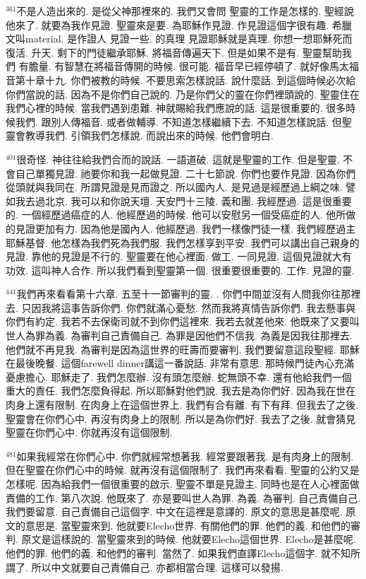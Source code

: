 \documentclass{book}
\begin{document}
$^{361}$不是人造出來的.
是從父神那裡來的.
我們又會問 聖靈的工作是怎樣的.
聖經說他來了.
就要為我作見證.
聖靈來是要.
為耶穌作見證.
作見證這個字很有趣.
希臘文叫material.
是作證人 見證一些.
的真理 見證耶穌就是真理.
你想一想耶穌死而復活.
升天.
剩下的門徒繼承耶穌.
將福音傳遍天下.
但是如果不是有.
聖靈幫助我們 有膽量.
有智慧在將福音傳開的時候.
很可能.
福音早已經停頓了.
就好像馬太福音第十章十九.
你們被教的時候.
不要思索怎樣說話.
說什麼話.
到這個時候必次給你們當說的話.
因為不是你們自己說的.
乃是你們父的靈在你們裡頭說的.
聖靈住在我們心裡的時候.
當我們遇到患難.
神就賜給我們應說的話.
這是很重要的.
很多時候我們.
跟別人傳福音.
或者做輔導.
不知道怎樣繼續下去.
不知道怎樣說話.
但聖靈會教導我們.
引領我們怎樣說.
而說出來的時候.
他們會明白.

$^{401}$很奇怪.
神往往給我們合而的說話.
一語道破.
這就是聖靈的工作.
但是聖靈.
不會自己單獨見證.
祂要你和我一起做見證.
二十七節說.
你們也要作見證.
因為你們從頭就與我同在.
所謂見證是見而證之.
所以國內人.
是見過是經歷過上綱之味.
譬如我去過北京.
我可以和你說天壇.
天安門十三陵.
義和團.
我經歷過.
這是很重要的.
一個經歷過癌症的人.
他經歷過的時候.
他可以安慰另一個受癌症的人.
他所做的見證更加有力.
因為他是國內人.
他經歷過.
我們一樣像門徒一樣.
我們經歷過主耶穌基督.
他怎樣為我們死為我們服.
我們怎樣享到平安.
我們可以講出自己親身的見證.
靠他的見證是不行的.
聖靈要在他心裡面.
做工.
一同見證.
這個見證就大有功效.
這叫神人合作.
所以我們看到聖靈第一個.
很重要很重要的.
工作.
見證的靈.

$^{441}$我們再來看看第十六章.
五至十一節審判的靈.
.
你們中間並沒有人問我你往那裡去.
只因我將這事告訴你們.
你們就滿心憂愁.
然而我將真情告訴你們.
我去懸事與你們有約定.
我若不去保衛司就不到你們這裡來.
我若去就差他來.
他既來了又要叫世人為罪為義.
為審判自己責備自己.
為罪是因他們不信我.
為義是因我往那裡去.
他們就不再見我.
為審判是因為這世界的旺壽而要審判.
我們要留意這段聖經.
耶穌在最後晚餐.
這個farewell dinner講這一番說話.
非常有意思.
那時候門徒內心充滿憂慮擔心.
耶穌走了.
我們怎麼辦.
沒有頭怎麼辦.
蛇無頭不幸.
還有他給我們一個重大的責任.
我們怎麼負得起.
所以耶穌對他們說.
我去是為你們好.
因為我在世在肉身上還有限制.
在肉身上在這個世界上.
我們有合有離.
有下有拜.
但我去了之後.
聖靈會在你們心中.
再沒有肉身上的限制.
所以是為你們好.
我去了之後.
就會猜見聖靈在你們心中.
你就再沒有這個限制.

$^{481}$如果我經常在你們心中.
你們就經常想著我.
經常要跟著我.
是有肉身上的限制.
但在聖靈在你們心中的時候.
就再沒有這個限制了.
我們再來看看.
聖靈的公約又是怎樣呢.
因為給我們一個很重要的啟示.
聖靈不單是見證主.
同時也是在人心裡面做責備的工作.
第八次說.
他既來了.
亦是要叫世人為罪.
為義.
為審判.
自己責備自己.
我們要留意.
自己責備自己這個字.
中文在這裡是意譯的.
原文的意思是甚麼呢.
原文的意思是.
當聖靈來到.
他就要Elecho世界.
有關他們的罪.
他們的義.
和他們的審判.
原文是這樣說的.
當聖靈來到的時候.
他就要Elecho這個世界.
Elecho是甚麼呢.
他們的罪.
他們的義.
和他們的審判.
當然了.
如果我們直譯Elecho這個字.
就不知所謂了.
所以中文就要自己責備自己.
亦都相當合理.
這樣可以發揚.
\end{document}
